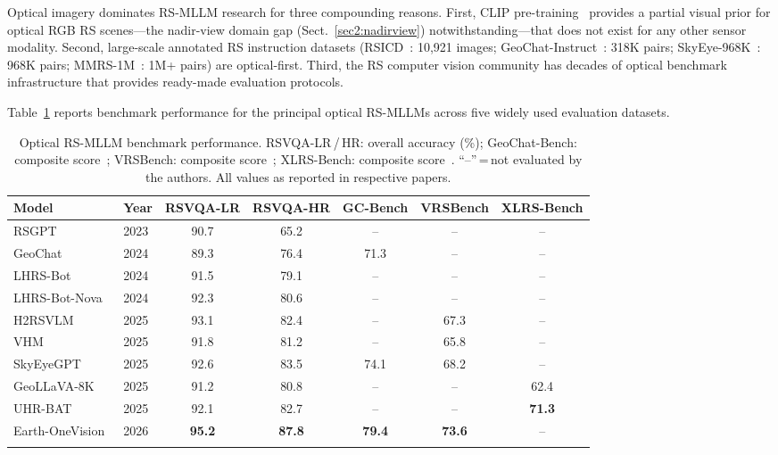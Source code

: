 Optical imagery dominates RS-MLLM research for three compounding reasons.
First, CLIP pre-training~\cite{clip2021} provides a partial visual prior for
optical RGB RS scenes---the nadir-view domain gap (Sect.~\ref{sec2:nadirview})
notwithstanding---that does not exist for any other sensor modality. Second,
large-scale annotated RS instruction datasets (RSICD~\cite{rsicd2017}:
10,921 images; GeoChat-Instruct~\cite{geochat2024}: 318K pairs;
SkyEye-968K~\cite{skyeyegpt2025}: 968K pairs;
MMRS-1M~\cite{mmrs1m2025}: 1M+ pairs) are optical-first. Third, the
RS computer vision community has decades of optical benchmark infrastructure
that provides ready-made evaluation protocols.

Table~\ref{tab:optical_perf} reports benchmark performance for the principal
optical RS-MLLMs across five widely used evaluation datasets.

\begin{table}[h]
\caption{Optical RS-MLLM benchmark performance. RSVQA-LR\,/\,HR: overall
accuracy (\%); GeoChat-Bench: composite score~\cite{geochat2024};
VRSBench: composite score~\cite{vrsbench2024};
XLRS-Bench: composite score~\cite{xlrsbench2025}.
``--''\,=\,not evaluated by the authors. All values as reported
in respective papers.}\label{tab:optical_perf}
\footnotesize\setlength\tabcolsep{3pt}
\begin{tabular*}{\textwidth}{@{\extracolsep\fill}llccccc}
\toprule
\textbf{Model} & \textbf{Year} &
\textbf{RSVQA-LR} & \textbf{RSVQA-HR} &
\textbf{GC-Bench} & \textbf{VRSBench} & \textbf{XLRS-Bench} \\
\midrule
RSGPT~\cite{rsgpt2023}               & 2023 & 90.7 & 65.2 & --   & --   & -- \\
GeoChat~\cite{geochat2024}            & 2024 & 89.3 & 76.4 & 71.3 & --   & -- \\
LHRS-Bot~\cite{lhrsbot2024}           & 2024 & 91.5 & 79.1 & --   & --   & -- \\
LHRS-Bot-Nova~\cite{lhrsbotnova2024}  & 2024 & 92.3 & 80.6 & --   & --   & -- \\
H2RSVLM~\cite{h2rsvlm2025}           & 2025 & 93.1 & 82.4 & --   & 67.3 & -- \\
VHM~\cite{vhm2025}                    & 2025 & 91.8 & 81.2 & --   & 65.8 & -- \\
SkyEyeGPT~\cite{skyeyegpt2025}        & 2025 & 92.6 & 83.5 & 74.1 & 68.2 & -- \\
GeoLLaVA-8K~\cite{geollava2025}       & 2025 & 91.2 & 80.8 & --   & --   & 62.4 \\
UHR-BAT~\cite{uhrbat2025}             & 2025 & 92.1 & 82.7 & --   & --   & \textbf{71.3} \\
Earth-OneVision~\cite{earthonevision2026} & 2026 &
  \textbf{95.2} & \textbf{87.8} & \textbf{79.4} & \textbf{73.6} & -- \\
\botrule
\end{tabular*}
\end{table}

